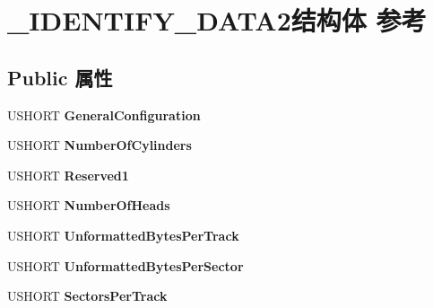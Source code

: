 \hypertarget{struct___i_d_e_n_t_i_f_y___d_a_t_a2}{}\section{\+\_\+\+I\+D\+E\+N\+T\+I\+F\+Y\+\_\+\+D\+A\+T\+A2结构体 参考}
\label{struct___i_d_e_n_t_i_f_y___d_a_t_a2}
\subsection*{Public 属性}
\begin{DoxyCompactItemize}
\item 
\mbox{\label{struct___i_d_e_n_t_i_f_y___d_a_t_a2_a6b0c32393c436507a3e7cb94549b8c27}} 
U\+S\+H\+O\+RT {\bfseries General\+Configuration}
\item 
\mbox{\label{struct___i_d_e_n_t_i_f_y___d_a_t_a2_a369543899ab91addc642491d9a6984e7}} 
U\+S\+H\+O\+RT {\bfseries Number\+Of\+Cylinders}
\item 
\mbox{\label{struct___i_d_e_n_t_i_f_y___d_a_t_a2_ad6d8dd8c5801ef82dadb8f1e887663ba}} 
U\+S\+H\+O\+RT {\bfseries Reserved1}
\item 
\mbox{\label{struct___i_d_e_n_t_i_f_y___d_a_t_a2_a05b44a40cba3975b0895c7c5ae10b3fd}} 
U\+S\+H\+O\+RT {\bfseries Number\+Of\+Heads}
\item 
\mbox{\label{struct___i_d_e_n_t_i_f_y___d_a_t_a2_a936233426190bba4076ddb803435786f}} 
U\+S\+H\+O\+RT {\bfseries Unformatted\+Bytes\+Per\+Track}
\item 
\mbox{\label{struct___i_d_e_n_t_i_f_y___d_a_t_a2_a26eb7402f9bf82edc8599eaf60bf3ad1}} 
U\+S\+H\+O\+RT {\bfseries Unformatted\+Bytes\+Per\+Sector}
\item 
\mbox{\label{struct___i_d_e_n_t_i_f_y___d_a_t_a2_a8c04932e5a8981a79c151d314c163b6e}} 
U\+S\+H\+O\+RT {\bfseries Sectors\+Per\+Track}
\item 
\mbox{\label{struct___i_d_e_n_t_i_f_y___d_a_t_a2_a11dd3115eb4db1c24f2769cd5b0b46d1}} 

\end{DoxyCompactItemize}
